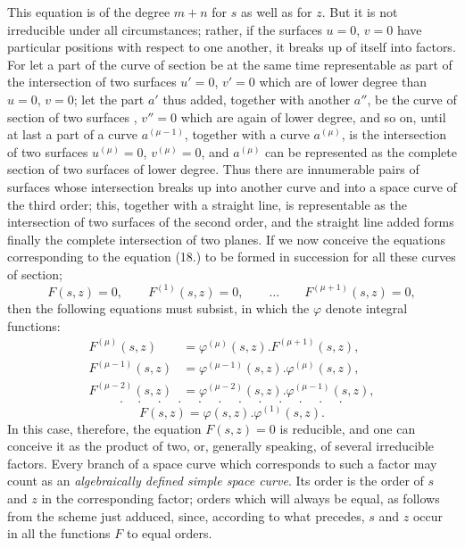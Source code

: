 \documentclass{article}
\begin{document}

This equation is of the degree $m+n$ for $s$ as well as for $z$. But it is not irreducible under all circumstances; rather, if the surfaces $u=0$, $v=0$ have particular positions with respect to one another, it breaks up of itself into factors. For let a part of the curve of section be at the same time representable as part of the intersection of two surfaces $u'=0$, $v'=0$ which are of lower degree than $u=0$, $v=0$; let the part $a'$ thus added, together with another $a''$, be the curve of section of two surfaces , $v''=0$ which are again of lower degree, and so on, until at last a part of a curve $a^{(\mu-1)}$, together with a curve $a^{(\mu)}$, is the intersection of two surfaces $u^{(\mu)}=0$, $v^{(\mu)}=0$, and $a^{(\mu)}$ can be represented as the complete section of two surfaces of lower degree. Thus there are innumerable pairs of surfaces whose intersection breaks up into another curve and into a space curve of the third order; this, together with a straight line, is representable as the intersection of two surfaces of the second order, and the straight line added forms finally the complete intersection of two planes. If we now conceive the equations corresponding to the equation (18.) to be formed in succession for all these curves of section;
\[
F(s,z)=0, \qquad F^{(1)}(s,z)=0, \qquad \ldots \qquad F^{(\mu+1)}(s,z)=0,
\]
then the following equations must subsist, in which the $\varphi$ denote integral functions:
\[
\begin{aligned}
F^{(\mu)}(s,z) &= \varphi^{(\mu)}(s,z).F^{(\mu+1)}(s,z),\\
F^{(\mu-1)}(s,z) &= \varphi^{(\mu-1)}(s,z).\varphi^{(\mu)}(s,z),\\
F^{(\mu-2)}(s,z) &= \varphi^{(\mu-2)}(s,z).\varphi^{(\mu-1)}(s,z),
\end{aligned}
\]
\[
\cdot\quad\cdot\quad\cdot\quad\cdot\quad\cdot\quad\cdot\quad\cdot\quad\cdot\quad\cdot\quad\cdot\quad\cdot\quad\cdot
\]
\[
F(s,z) = \varphi(s,z).\varphi^{(1)}(s,z).
\]
In this case, therefore, the equation $F(s,z)=0$ is reducible, and one can conceive it as the product of two, or, generally speaking, of several irreducible factors. Every branch of a space curve which corresponds to such a factor may count as an \emph{algebraically defined simple space curve}. Its order is the order of $s$ and $z$ in the corresponding factor; orders which will always be equal, as follows from the scheme just adduced, since, according to what precedes, $s$ and $z$ occur in all the functions $F$ to equal orders.
\end{document}
